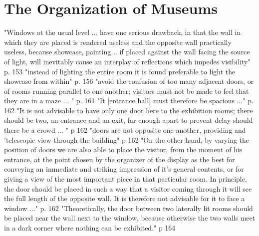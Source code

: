 \documentclass[12pt]{ucthesis}
\begin{document}
\section{The Organization of Museums}
"Windows at the usual level ... have one serious drawback, in that the wall in which they are placed is rendered useless and the opposite wall practically useless, because showcase, painting .. if placed against the wall facing the source of light, will inevitably cause an interplay of reflections which impedes visibility" p. 153
"instead of lighting the entire room it is found preferable to light the showcase from within" p. 156
"avoid the confusion of too many adjacent doors, or of rooms running parallel to one another; visitors must not be made to feel that they are in a maze ... " p. 161
"It [entrance hall] must therefore be spacious ..." p. 162
"It is not advisable to have only one door here to the exhibition rooms; there should be two, an entrance and an exit, far enough apart to prevent delay should there be a crowd ... " p 162
"doors are not opposite one another, providing and 'telescopic view through the building" p 162
"On the other hand, by varying the position of doors we are also able to place the visitor, from the moment of his entrance, at the point chosen by the organizer of the display as the best for conveying an immediate and striking impression of it's general contents, or for giving a view of the most important piece in that particular room. In principle, the door should be placed in such a way that a visitor coming through it will see the full length of the opposite wall. It is therefore not advisable for it to face a window ..." p. 162
"Theoretically, the door between two laterally lit rooms should be placed near the wall next to the window, because otherwise the two walls meet in a dark corner where nothing can be exhibited." p 164




\clearpage



\end{document}
